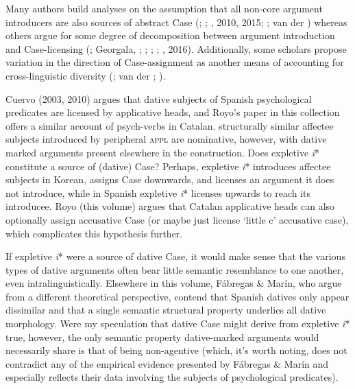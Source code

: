 \documentclass[output=paper,modfonts,nonflat]{langsci/langscibook}
\begin{document}
Many authors build analyses on the assumption that all non-core argument introducers are also sources of abstract Case (\citealt{MchomboFirmino1999}; \citealt{Jeong2007}; \citealt{Cuervo2003}, 2010, 2015; \citealt{Sheehan2013}; van der \citealt{Wal2017}) whereas others argue for some degree of decomposition between argument introduction and Case-licensing (\citealt{BakerCollins2006}; Georgala, \citealt{PaulWhitman2008}; \citealt{Georgala2012}; \citealt{HaddicanHolmberg2012}; \citealt{Halpert2012}; \citealt{Wechsler2014}, 2016). Additionally, some scholars propose variation in the direction of Case-assignment as another means of accounting for cross-linguistic diversity (\citealt{Sheehan2013}; van der \citealt{Wal2017}; \citealt{Baker2008}). 



Cuervo (2003, 2010) argues that dative subjects of Spanish psychological predicates are licensed by applicative heads, and Royo’s paper in this collection offers a similar account of psych-verbs in Catalan.  structurally similar affectee subjects introduced by peripheral \textsc{appl} are nominative, however, with dative marked arguments present elsewhere in the construction. Does expletive \textit{i}* constitute a source of (dative) Case? Perhaps, expletive \textit{i}* introduces affectee subjects in Korean, assigns Case downwards, and licenses an argument it does not introduce, while in Spanish expletive \textit{i}* licenses upwards to reach its introducee. Royo (this volume) argues that Catalan applicative heads can also optionally assign accusative Case (or maybe just license ‘little c’ accusative case), which complicates this hypothesis further. 



If expletive \textit{i}* were a source of dative Case, it would make sense that the various types of dative arguments often bear little semantic resemblance to one another, even intralinguistically. Elsewhere in this volume, Fábregas \& Marín, who argue from a different theoretical perspective, contend that Spanish datives only appear dissimilar and that a single semantic structural property underlies all dative morphology. Were my speculation that dative Case might derive from expletive \textit{i}* true, however, the only semantic property dative-marked arguments would necessarily share is that of being non-agentive (which, it’s worth noting, does not contradict any of the empirical evidence presented by Fábregas \& Marín and especially reflects their data involving the subjects of psychological predicates). 
\end{document}
